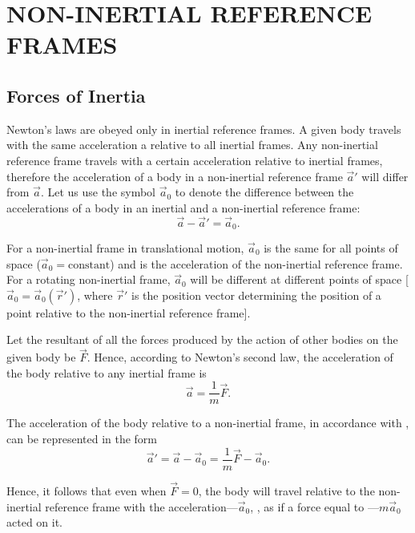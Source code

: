 

\chapter{NON-INERTIAL REFERENCE FRAMES}\label{chap:4}

\section{Forces of Inertia}\label{sec:4_1}

Newton's laws are obeyed only in inertial reference frames. A given body travels with the same acceleration a relative to all inertial frames. Any non-inertial reference frame travels with a certain acceleration relative to inertial frames, therefore the acceleration of a body in a non-inertial reference frame $\vec{a}'$ will differ from $\vec{a}$. Let us use the symbol $\vec{a}_0$ to denote the difference between the accelerations of a body in an inertial and a non-inertial reference frame:
\begin{equation}\label{eq:4_1}
\vec{a} - \vec{a}' = \vec{a}_0.
\end{equation}

\noindent
For a non-inertial frame in translational motion, $\vec{a}_0$ is the same for all points of space ($\vec{a}_0=\text{constant}$) and is the acceleration of the non-inertial reference frame. For a rotating non-inertial frame, $\vec{a}_0$ will be different at different points of space [$\vec{a}_0=\vec{a}_0(\vec{r}')$, where $\vec{r}'$ is the position vector determining the position of a point relative to the non-inertial reference frame].

Let the resultant of all the forces produced by the action of other bodies on the given body be $\vec{F}$. Hence, according to Newton's second law, the acceleration of the body relative to any inertial frame is
\begin{equation*}
\vec{a} = \frac{1}{m}\vec{F}.
\end{equation*}

\noindent
The acceleration of the body relative to a non-inertial frame, in accordance with , can be represented in the form
\begin{equation*}
\vec{a}' = \vec{a} - \vec{a}_0 = \frac{1}{m}\vec{F} - \vec{a}_0.
\end{equation*}

\noindent
Hence, it follows that even when $\vec{F}=0$, the body will travel relative to the non-inertial reference frame with the acceleration---$\vec{a}_0$, \ie, as if a force equal to ---$m\vec{a}_0$ acted on it.

